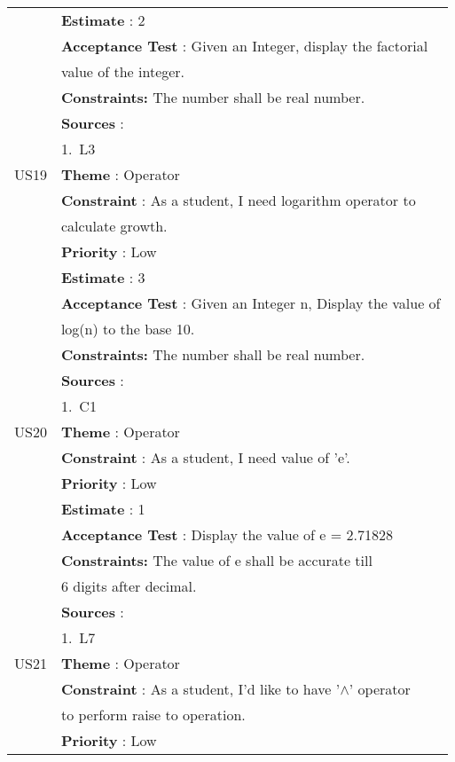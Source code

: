 \documentclass{article}
\begin{document}
\begin{longtable}{|| c || l ||}
         & \textbf{Estimate} : 2 \\
         & \textbf{Acceptance Test} : Given an Integer, display the factorial \\
         & value of the integer.\\
         & \textbf{Constraints: } The number shall be real number.\\
         & \textbf{Sources} : \\
         & 1.~L3 \\
         \hline
         US19 & \textbf{Theme} : Operator \\
         & \textbf{Constraint} : As a student, I need logarithm operator to \\
         & calculate growth.\\
         & \textbf{Priority} : Low \\
         & \textbf{Estimate} : 3 \\
         & \textbf{Acceptance Test} : Given an Integer n, Display the value of\\
         & log(n) to the base 10.\\
         & \textbf{Constraints: } The number shall be real number.\\
         & \textbf{Sources} : \\
         & 1.~C1 \\
         \hline
         US20 & \textbf{Theme} : Operator \\
         & \textbf{Constraint} : As a student, I need value of 'e'.\\
         & \textbf{Priority} : Low \\
         & \textbf{Estimate} : 1 \\
         & \textbf{Acceptance Test} : Display the value of e =  2.71828\\
         & \textbf{Constraints: } The value of e shall be accurate till \\
         & 6 digits after decimal.\\
         & \textbf{Sources} : \\
         & 1.~L7 \\
        \hline
        \newpage
        \hline
         US21 & \textbf{Theme} : Operator \\
         & \textbf{Constraint} : As a student, I'd like to have '$\wedge$' operator\\
         & to perform raise to operation.\\
         & \textbf{Priority} : Low \\

\end{longtable}
\end{document}
